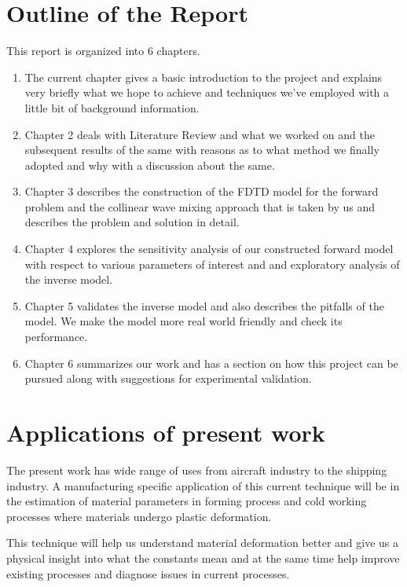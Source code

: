 \section{Outline of the Report}
This report is organized into 6 chapters.
\begin{enumerate}

\item The current chapter gives a basic introduction to the project and explains very briefly what we hope to achieve and techniques we've employed with a little bit of background information.

\item Chapter 2 deals with Literature Review and what we worked on and the subsequent results of the same with reasons as to what method we finally adopted and why with a discussion about the same.

\item Chapter 3 describes the construction of the FDTD model for the forward problem and the collinear wave mixing approach that is taken by us and describes the problem and solution in detail.

\item Chapter 4 explores the sensitivity analysis of our constructed forward model with respect to various parameters of interest and and exploratory analysis of the inverse model.

\item Chapter 5 validates the inverse model and also describes the pitfalls of the model. We make the model more real world friendly and check its performance.

\item Chapter 6 summarizes our work and has a section on how this project can be pursued along with suggestions for experimental validation.
\end{enumerate}
\section{Applications of present work}
The present work has wide range of uses from aircraft industry to the shipping industry. A manufacturing specific application of this current technique will be in the estimation of material parameters in forming process and cold working processes where materials undergo plastic deformation. 

This technique will help us understand material deformation better and give us a physical insight into what the constants mean and at the same time help improve existing processes and diagnose issues in current processes.  